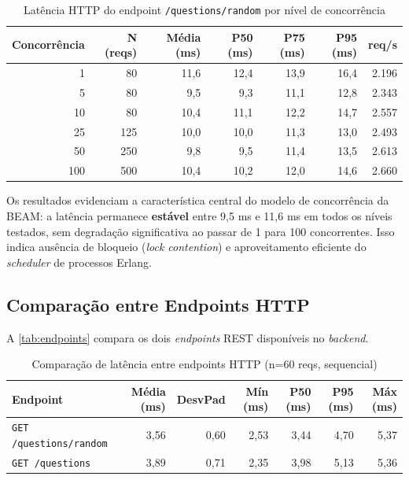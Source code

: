 \documentclass[
	12pt,
	openany,
	oneside,
	a4paper,
	english,
	brazil
]{abntex2}
\begin{document}
\begin{table}[htb]
\caption{\label{tab:latencia_concorrencia}Latência HTTP do endpoint \texttt{/questions/random} por nível de concorrência}
\begin{tabular}{r|r|r|r|r|r|r}
  \toprule
  \textbf{Concorrência} & \textbf{N (reqs)} & \textbf{Média (ms)} & \textbf{P50 (ms)} & \textbf{P75 (ms)} & \textbf{P95 (ms)} & \textbf{req/s} \\
  \midrule
  1   &  80 & 11,6 & 12,4 & 13,9 & 16,4 & 2.196 \\
  5   &  80 &  9,5 &  9,3 & 11,1 & 12,8 & 2.343 \\
  10  &  80 & 10,4 & 11,1 & 12,2 & 14,7 & 2.557 \\
  25  & 125 & 10,0 & 10,0 & 11,3 & 13,0 & 2.493 \\
  50  & 250 &  9,8 &  9,5 & 11,4 & 13,5 & 2.613 \\
  100 & 500 & 10,4 & 10,2 & 12,0 & 14,6 & 2.660 \\
  \bottomrule
\end{tabular}
\end{table}

Os resultados evidenciam a característica central do modelo de concorrência da BEAM: a latência permanece \textbf{estável} entre 9,5 ms e 11,6 ms em todos os níveis testados, sem degradação significativa ao passar de 1 para 100 concorrentes. Isso indica ausência de bloqueio (\textit{lock contention}) e aproveitamento eficiente do \textit{scheduler} de processos Erlang.

\subsection{Comparação entre Endpoints HTTP}

A \autoref{tab:endpoints} compara os dois \textit{endpoints} REST disponíveis no \textit{backend}.

\begin{table}[htb]
\caption{\label{tab:endpoints}Comparação de latência entre endpoints HTTP (n=60 reqs, sequencial)}
\begin{tabular}{l|r|r|r|r|r|r}
  \toprule
  \textbf{Endpoint} & \textbf{Média (ms)} & \textbf{DesvPad} & \textbf{Mín (ms)} & \textbf{P50 (ms)} & \textbf{P95 (ms)} & \textbf{Máx (ms)} \\
  \midrule
  \texttt{GET /questions/random} & 3,56 & 0,60 & 2,53 & 3,44 & 4,70 & 5,37 \\
  \texttt{GET /questions}        & 3,89 & 0,71 & 2,35 & 3,98 & 5,13 & 5,36 \\
  \bottomrule
\end{tabular}
\end{table}
\end{document}
